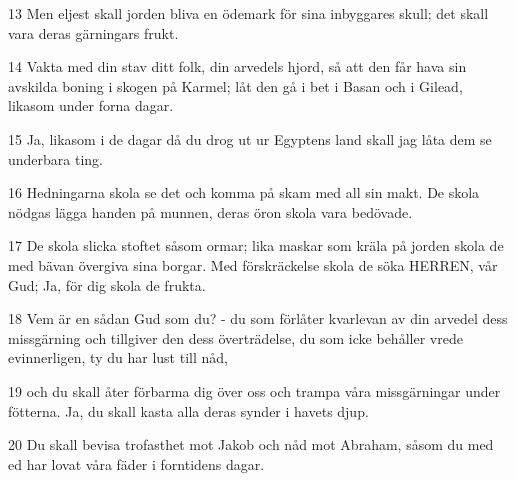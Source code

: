 \par 13 Men eljest skall jorden bliva en ödemark för sina inbyggares skull; det skall vara deras gärningars frukt.
\par 14 Vakta med din stav ditt folk, din arvedels hjord, så att den får hava sin avskilda boning i skogen på Karmel; låt den gå i bet i Basan och i Gilead, likasom under forna dagar.
\par 15 Ja, likasom i de dagar då du drog ut ur Egyptens land skall jag låta dem se underbara ting.
\par 16 Hedningarna skola se det och komma på skam med all sin makt. De skola nödgas lägga handen på munnen, deras öron skola vara bedövade.
\par 17 De skola slicka stoftet såsom ormar; lika maskar som kräla på jorden skola de med bävan övergiva sina borgar. Med förskräckelse skola de söka HERREN, vår Gud; Ja, för dig skola de frukta.
\par 18 Vem är en sådan Gud som du? - du som förlåter kvarlevan av din arvedel dess missgärning och tillgiver den dess överträdelse, du som icke behåller vrede evinnerligen, ty du har lust till nåd,
\par 19 och du skall åter förbarma dig över oss och trampa våra missgärningar under fötterna. Ja, du skall kasta alla deras synder i havets djup.
\par 20 Du skall bevisa trofasthet mot Jakob och nåd mot Abraham, såsom du med ed har lovat våra fäder i forntidens dagar.


